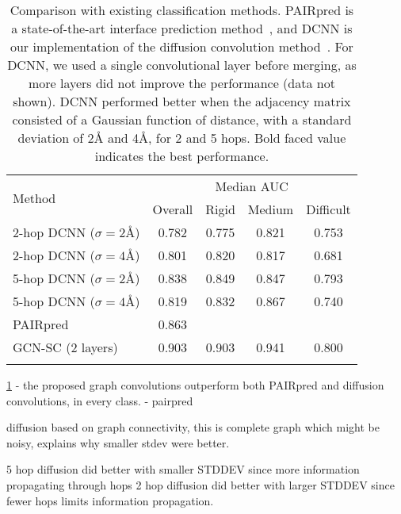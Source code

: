 \begin{table}
	\begin{center}
		\begin{tabular}{l c c c c }
			\toprule
			\multirow{2}{*}{Method} & \multicolumn{4}{c}{Median AUC} \\
			& Overall & Rigid & Medium & Difficult \\
			\midrule
			2-hop DCNN ($\sigma=2$\AA{}) & 0.782 & 0.775 & 0.821 & 0.753 \\
			2-hop DCNN ($\sigma=4$\AA{}) & 0.801 & 0.820 & 0.817 & 0.681 \\
			\midrule
			5-hop DCNN ($\sigma=2$\AA{}) & 0.838 & 0.849 & 0.847 & 0.793 \\ 
			5-hop DCNN ($\sigma=4$\AA{}) & 0.819 & 0.832 & 0.867 & 0.740 \\ 
			\midrule
			PAIRpred      & 0.863        & & & \\
			\midrule
			GCN-SC (2 layers) & 0.903 & 0.903 & 0.941 & 0.800 \\ 
			\bottomrule
			\\
		\end{tabular}
		\caption{Comparison with existing classification methods. 
			PAIRpred is a state-of-the-art interface prediction method~\cite{minhas2014}, and DCNN is our implementation of the diffusion convolution method~\cite{atwood2016}.
			For DCNN, we used a single convolutional layer before merging, as more layers did not improve the performance (data not shown). DCNN performed better when the adjacency matrix consisted of a Gaussian function of distance, with a standard deviation of 2\AA{} and 4\AA{}, for 2 and 5 hops. Bold faced value indicates the best performance.}
		\label{tab:results_compare}
	\end{center}
\end{table}


\ref{tab:results_compare}
	- the proposed graph convolutions outperform both PAIRpred and diffusion convolutions, in every class.
	- pairpred 
	



diffusion based on graph connectivity, this is complete graph which might be noisy, explains why smaller stdev were better.

5 hop diffusion did better with smaller STDDEV since more information propagating through hops
2 hop diffusion did better with larger STDDEV since fewer hops limits information propagation.








